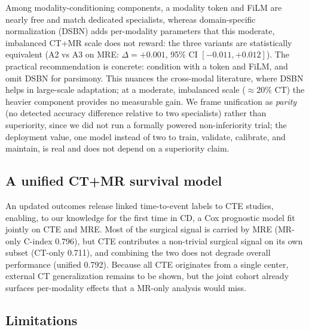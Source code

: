 \documentclass[11pt]{article}
\begin{document}
Among modality-conditioning components, a modality token and FiLM are nearly free and match dedicated
specialists, whereas domain-specific normalization (DSBN) adds per-modality parameters that this
moderate, imbalanced CT+MR scale does not reward: the three variants are statistically equivalent
(A2 vs A3 on MRE: $\Delta = +0.001$, 95\% CI $[-0.011, +0.012]$). The practical
recommendation is concrete: condition with a token and FiLM, and omit DSBN for parsimony. This nuances the
cross-modal literature, where DSBN helps in large-scale adaptation; at a moderate,
imbalanced scale ($\approx 20\%$ CT) the heavier component provides no measurable gain. We frame
unification as \emph{parity} (no detected accuracy difference relative to two specialists) rather than
superiority, since we did not run a formally powered non-inferiority trial; the deployment value, one
model instead of two to train, validate, calibrate, and maintain, is real and does not depend on a
superiority claim.

\subsection*{A unified CT+MR survival model}

An updated outcomes release linked time-to-event labels to CTE studies, enabling, to our knowledge for
the first time in CD, a Cox prognostic model fit jointly on CTE and MRE. Most of the surgical signal is
carried by MRE (MR-only C-index 0.796), but CTE contributes a non-trivial surgical signal on its own subset
(CT-only 0.711), and combining the two does not degrade overall performance (unified 0.792). Because
all CTE originates from a single center, external CT generalization remains to be shown, but the joint
cohort already surfaces per-modality effects that a MR-only analysis would miss.

\subsection*{Limitations}
\end{document}

